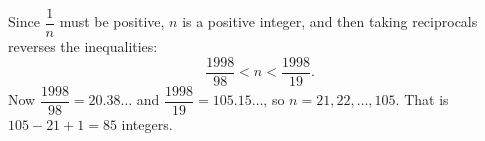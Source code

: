 Since $\dfrac{1}{n}$ must be positive, $n$ is a positive integer, and then taking reciprocals reverses the inequalities:
\[
\dfrac{1998}{98}<n<\dfrac{1998}{19}.
\]
Now $\dfrac{1998}{98}=20.38\ldots$ and $\dfrac{1998}{19}=105.15\ldots$, so $n=21,22,\dots,105$. That is $105-21+1=\boxed{85}$ integers.
